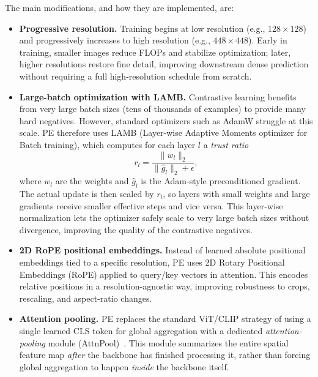 \begin{enrichment}
\begin{enrichment}
		The main modifications, and how they are implemented, are:
		\begin{itemize}
			\item \textbf{Progressive resolution.} Training begins at low resolution (e.g., $128\times 128$) and progressively increases to high resolution (e.g., $448\times 448$). Early in training, smaller images reduce FLOPs and stabilize optimization; later, higher resolutions restore fine detail, improving downstream dense prediction without requiring a full high-resolution schedule from scratch.
			\item \textbf{Large-batch optimization with LAMB.} Contrastive learning benefits from very large batch sizes (tens of thousands of examples) to provide many hard negatives. However, standard optimizers such as AdamW struggle at this scale. PE therefore uses LAMB (Layer-wise Adaptive Moments optimizer for Batch training), which computes for each layer $l$ a \emph{trust ratio}
			\[
			r_l = \frac{\|w_l\|_2}{\|\hat{g}_l\|_2 + \epsilon},
			\]
			where $w_l$ are the weights and $\hat{g}_l$ is the Adam-style preconditioned gradient. The actual update is then scaled by $r_l$, so layers with small weights and large gradients receive smaller effective steps and vice versa. This layer-wise normalization lets the optimizer safely scale to very large batch sizes without divergence, improving the quality of the contrastive negatives.
			\item \textbf{2D RoPE positional embeddings.} Instead of learned absolute positional embeddings tied to a specific resolution, PE uses 2D Rotary Positional Embeddings (RoPE) applied to query/key vectors in attention. This encodes relative positions in a resolution-agnostic way, improving robustness to crops, rescaling, and aspect-ratio changes.
			
	       \item \textbf{Attention pooling.} PE replaces the standard ViT/CLIP strategy of using a
	       single learned CLS token for global aggregation with a dedicated
	       \emph{attention-pooling} module (AttnPool)~\cite{zhai2023_siglip,bolya2025_perceptionencoder}.
	       This module summarizes the entire spatial feature map \emph{after} the backbone
	       has finished processing it, rather than forcing global aggregation to happen
	       \emph{inside} the backbone itself.
	       
	       \newpage
	       

\end{itemize}
\end{enrichment}
\end{enrichment}
